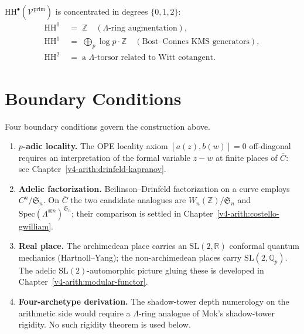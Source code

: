 \begin{conjecture}
\label{v4-arith:conj:H-naive}
\(\mathrm{HH}^{\bullet}(\mathcal{V}^{\mathrm{prim}})\) is concentrated
in degrees \(\{0,1,2\}\):
\begin{align}
\mathrm{HH}^{0}&\;=\;\mathbb{Z}\quad(\Lambda\text{-ring augmentation}), \\
\mathrm{HH}^{1}&\;=\;\bigoplus_{p}\log p\cdot\mathbb{Z}\quad(\text{Bost--Connes KMS generators}), \\
\mathrm{HH}^{2}&\;=\;\text{a }\Lambda\text{-torsor related to Witt cotangent}.
\end{align}
\end{conjecture}

\section{Boundary Conditions}
\label{v4-arith:construction:open-technical}

Four boundary conditions govern the construction above.

\begin{enumerate}
\item \textbf{\(p\)-adic locality.} The OPE locality axiom \([a(z),b(w)]=0\)
off-diagonal requires an interpretation of the formal variable \(z-w\)
at finite places of \(\overline{C}\): see
Chapter~\ref{v4-arith:drinfeld-kapranov}.
\item \textbf{Adelic factorization.} Beilinson--Drinfeld
factorization on a curve employs \(C^{n}/\mathfrak{S}_{n}\). On
\(\overline{C}\) the two candidate analogues are
\(W_{n}(\mathbb{Z})/\mathfrak{S}_{n}\) and
\(\mathrm{Spec}(\Lambda^{\otimes n})^{\mathfrak{S}_{n}}\); their
comparison is settled in
Chapter~\ref{v4-arith:costello-gwilliam}.
\item \textbf{Real place.} The archimedean place carries an
\(\mathrm{SL}(2,\mathbb{R})\) conformal quantum mechanics
(Hartnoll--Yang); the non-archimedean places carry
\(\mathrm{SL}(2,\mathbb{Q}_{p})\). The adelic
\(\mathrm{SL}(2)\)-automorphic picture gluing these is developed in
Chapter~\ref{v4-arith:modular-functor}.
\item \textbf{Four-archetype derivation.} The shadow-tower depth
numerology on the arithmetic side would require a \(\Lambda\)-ring
analogue of Mok's shadow-tower rigidity. No such rigidity theorem is
used below.
\end{enumerate}
